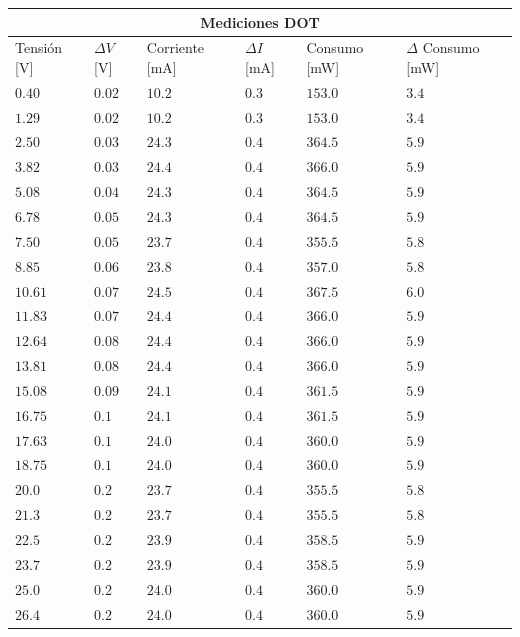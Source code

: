 \documentclass[12pt,a4paper]{article}
\begin{document}
				\begin{center}
			
			{\footnotesize \begin{tabular}{ |l|l|l|l|l|l| }

			\hline
				\multicolumn{6}{|c|}{\textbf{Mediciones DOT}}\\ \hline
				Tensión [V] & $\Delta V$ [V] & Corriente [mA] & $\Delta I$ [mA] & Consumo [mW] & $\Delta$ Consumo [mW]\\ \hline
				$0.40$ & $0.02$ & $10.2$ & $0.3$ & $153.0$ & $3.4$ \\ \hline
				$1.29$ & $0.02$ & $10.2$ & $0.3$ & $153.0$ & $3.4$ \\ \hline
				$2.50$ & $0.03$ & $24.3$ & $0.4$ & $364.5$ & $5.9$ \\ \hline
				$3.82$ & $0.03$ & $24.4$ & $0.4$ & $366.0$ & $5.9$ \\ \hline
				$5.08$ & $0.04$ & $24.3$ & $0.4$ & $364.5$ & $5.9$ \\ \hline
				$6.78$ & $0.05$ & $24.3$ & $0.4$ & $364.5$ & $5.9$ \\ \hline
				$7.50$ & $0.05$ & $23.7$ & $0.4$ & $355.5$ & $5.8$ \\ \hline
				$8.85$ & $0.06$ & $23.8$ & $0.4$ & $357.0$ & $5.8$ \\ \hline
				$10.61$ & $0.07$ & $24.5$ & $0.4$ & $367.5$ & $6.0$ \\ \hline
				$11.83$ & $0.07$ & $24.4$ & $0.4$ & $366.0$ & $5.9$ \\ \hline
				$12.64$ & $0.08$ & $24.4$ & $0.4$ & $366.0$ & $5.9$ \\ \hline
				$13.81$ & $0.08$ & $24.4$ & $0.4$ & $366.0$ & $5.9$ \\ \hline
				$15.08$ & $0.09$ & $24.1$ & $0.4$ & $361.5$ & $5.9$ \\ \hline
				$16.75$ & $0.1$ & $24.1$ & $0.4$ & $361.5$ & $5.9$ \\ \hline
				$17.63$ & $0.1$ & $24.0$ & $0.4$ & $360.0$ & $5.9$ \\ \hline
				$18.75$ & $0.1$ & $24.0$ & $0.4$ & $360.0$ & $5.9$ \\ \hline
				$20.0$ & $0.2$ & $23.7$ & $0.4$ & $355.5$ & $5.8$ \\ \hline
				$21.3$ & $0.2$ & $23.7$ & $0.4$ & $355.5$ & $5.8$ \\ \hline
				$22.5$ & $0.2$ & $23.9$ & $0.4$ & $358.5$ & $5.9$ \\ \hline
				$23.7$ & $0.2$ & $23.9$ & $0.4$ & $358.5$ & $5.9$ \\ \hline
				$25.0$ & $0.2$ & $24.0$ & $0.4$ & $360.0$ & $5.9$ \\ \hline
				$26.4$ & $0.2$ & $24.0$ & $0.4$ & $360.0$ & $5.9$ \\ \hline
 				
				
			\end{tabular}}\label{tab:consumodot}
			\end{center}
\end{document}
